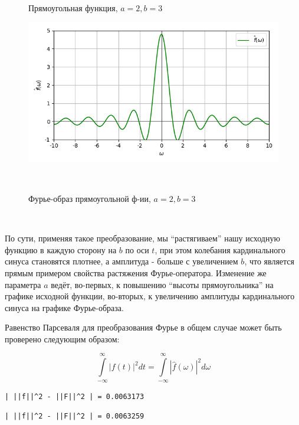 \documentclass[a4paper]{article}
\let\oldint\int
\def\int{\oldint\limits}
\begin{document}
\begin{figure}[H]
\begin{minipage}{0.5\textwidth}
        \caption{Прямоугольная функция, $a = 2, b = 3$}
    \end{minipage}\hfill
    \begin{minipage}{0.5\textwidth}
        \centering \includegraphics[width=\textwidth]{rectangular/real_fourier_2_3.png}
        \caption{Фурье-образ прямоугольной ф-ии, $a = 2, b = 3$}
    \end{minipage}\\[1em]
\end{figure}\noindent\

По сути, применяя такое преобразование, мы ``растягиваем'' нашу исходную функцию в каждую сторону на $b$ по оси $t$, при этом колебания кардинального синуса становятся плотнее, а амплитуда - больше с увеличением $b$, что является прямым примером свойства растяжения Фурье-оператора. Изменение же параметра $a$ ведёт, во-первых, к повышению ``высоты прямоугольника'' на графике исходной функции, во-вторых, к увеличению амплитуды кардинального синуса на графике Фурье-образа.\

Равенство Парсеваля для преобразования Фурье в общем случае может быть проверено следующим образом:

$$\int_{-\infty}^{\infty}\left\lvert f(t)\right\rvert^2dt = \int_{-\infty}^{\infty}\left\lvert \hat{f}(\omega)\right\rvert^2d\omega$$

\begin{lstlisting}[caption={Равенство Парсеваля при $a = 1, b = 1$}, numbers=none]
| ||f||^2 - ||F||^2 | = 0.0063173
\end{lstlisting}

\begin{lstlisting}[caption={Равенство Парсеваля при $a = 1, b = 3$}, numbers=none]
| ||f||^2 - ||F||^2 | = 0.0063259
\end{lstlisting}
\end{document}
